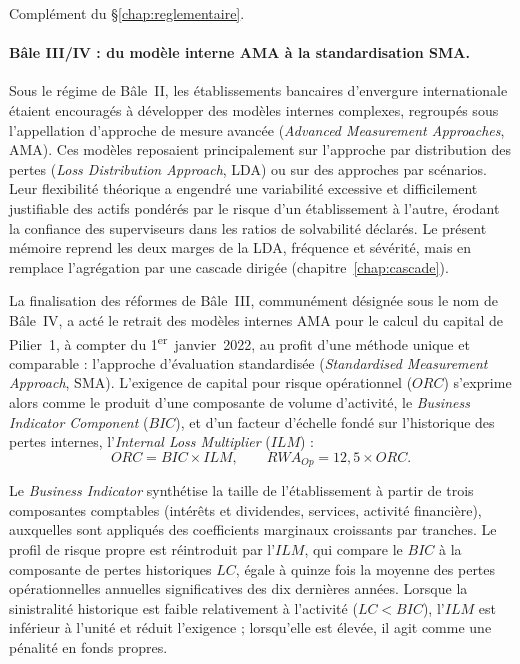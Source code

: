 
Complément du \S\ref{chap:reglementaire}.

\paragraph{Bâle III/IV : du modèle interne AMA à la standardisation SMA.}
Sous le régime de Bâle~II, les établissements bancaires d'envergure internationale
étaient encouragés à développer des modèles internes complexes, regroupés sous
l'appellation d'approche de mesure avancée (\emph{Advanced Measurement Approaches},
AMA). Ces modèles reposaient principalement sur l'approche par distribution des pertes
(\emph{Loss Distribution Approach}, LDA) ou sur des approches par scénarios. Leur flexibilité
théorique a engendré une variabilité excessive et difficilement justifiable des actifs pondérés
par le risque d'un établissement à l'autre, érodant la confiance des superviseurs dans les
ratios de solvabilité déclarés. Le présent mémoire reprend les deux marges de la LDA, fréquence
et sévérité, mais en remplace l'agrégation par une cascade dirigée
(chapitre~\ref{chap:cascade}).

La finalisation des réformes de Bâle~III, communément désignée sous le nom de Bâle~IV,
a acté le retrait des modèles internes AMA pour le calcul du capital de Pilier~1, à
compter du 1\textsuperscript{er}~janvier~2022, au profit d'une méthode unique et
comparable : l'approche d'évaluation standardisée (\emph{Standardised Measurement
Approach}, SMA). L'exigence de capital pour risque opérationnel ($ORC$) s'exprime alors
comme le produit d'une composante de volume d'activité, le \emph{Business Indicator
Component} ($BIC$), et d'un facteur d'échelle fondé sur l'historique des pertes internes,
l'\emph{Internal Loss Multiplier} ($ILM$) :
\begin{equation}
ORC = BIC \times ILM,
\qquad
RWA_{Op} = 12{,}5 \times ORC.
\end{equation}

Le \emph{Business Indicator} synthétise la taille de l'établissement à partir de trois
composantes comptables (intérêts et dividendes, services, activité financière), auxquelles
sont appliqués des coefficients marginaux croissants par tranches. Le profil de risque
propre est réintroduit par l'$ILM$, qui compare le $BIC$ à la composante de pertes
historiques $LC$, égale à quinze fois la moyenne des pertes opérationnelles annuelles
significatives des dix dernières années. Lorsque la sinistralité historique est faible
relativement à l'activité ($LC < BIC$), l'$ILM$ est inférieur à l'unité et réduit
l'exigence ; lorsqu'elle est élevée, il agit comme une pénalité en fonds propres.

